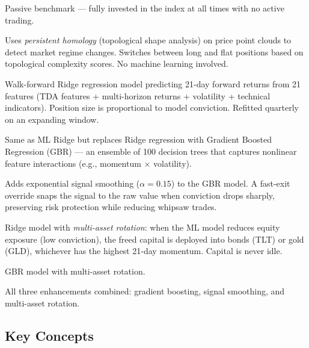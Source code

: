 \documentclass[11pt]{article}
\begin{document}
\begin{description}[style=nextline, leftmargin=2.5cm, font=\bfseries]
    \item[Buy \& Hold] Passive benchmark --- fully invested in the index at all times with no active trading.
    \item[TDA Adaptive] Uses \emph{persistent homology} (topological shape analysis) on price point clouds to detect market regime changes. Switches between long and flat positions based on topological complexity scores. No machine learning involved.
    \item[ML Ridge] Walk-forward Ridge regression model predicting 21-day forward returns from 21 features (TDA features + multi-horizon returns + volatility + technical indicators). Position size is proportional to model conviction. Refitted quarterly on an expanding window.
    \item[ML GBR] Same as ML Ridge but replaces Ridge regression with Gradient Boosted Regression (GBR) --- an ensemble of 100 decision trees that captures nonlinear feature interactions (e.g., momentum $\times$ volatility).
    \item[ML GBR + Smooth] Adds exponential signal smoothing ($\alpha = 0.15$) to the GBR model. A fast-exit override snaps the signal to the raw value when conviction drops sharply, preserving risk protection while reducing whipsaw trades.
    \item[ML Ridge + Rotation] Ridge model with \emph{multi-asset rotation}: when the ML model reduces equity exposure (low conviction), the freed capital is deployed into bonds (TLT) or gold (GLD), whichever has the highest 21-day momentum. Capital is never idle.
    \item[ML GBR + Rotation] GBR model with multi-asset rotation.
    \item[ML GBR + Sm + Rot] All three enhancements combined: gradient boosting, signal smoothing, and multi-asset rotation.
\end{description}

\subsection*{Key Concepts}
\end{document}
